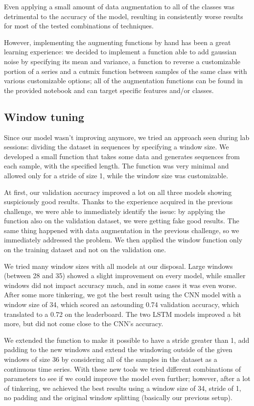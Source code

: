 \documentclass[11pt]{report}
\begin{document}
Even applying a small amount of data augmentation to all of the classes was detrimental to the accuracy of the model, resulting in consistently worse results for most of the tested combinations of techniques.

However, implementing the augmenting functions by hand has been a great learning experience: we decided to implement a function able to add gaussian noise by specifying its mean and variance, a function to reverse a customizable portion of a series and a cutmix function between samples of the same class with various customizable options; all of the augmentation functions can be found in the provided notebook and can target specific features and/or classes.

\subsection{Window tuning}
Since our model wasn't improving anymore, we tried an approach seen during lab sessions: dividing the dataset in sequences by specifying a window size. We developed a small function that takes some data and generates sequences from each sample, with the specified length.
The function was very minimal and allowed only for a stride of size 1, while the window size was customizable.

At first, our validation accuracy improved a lot on all three models showing suspiciously good results.
Thanks to the experience acquired in the previous challenge, we were able to immediately identify the issue: by applying the function also on the validation dataset, we were getting fake good results.
The same thing happened with data augmentation in the previous challenge, so we immediately addressed the problem.
We then applied the window function only on the training dataset and not on the validation one.

We tried many window sizes with all models at our disposal.
Large windows (between 28 and 35) showed a slight improvement on every model, while smaller windows did not impact accuracy much, and in some cases it was even worse.
After some more tinkering, we got the best result using the CNN model with a window size of 34, which scored an astounding 0.74 validation accuracy, which translated to a 0.72 on the leaderboard.
The two LSTM models improved a bit more, but did not come close to the CNN's accuracy.

We extended the function to make it possible to have a stride greater than 1, add padding to the new windows and extend the windowing outside of the given windows of size 36 by considering all of the samples in the dataset as a continuous time series.
With these new tools we tried different combinations of parameters to see if we could improve the model even further; however, after a lot of tinkering, we achieved the best results using a window size of 34, stride of 1, no padding and the original window splitting (basically our previous setup).
\end{document}
